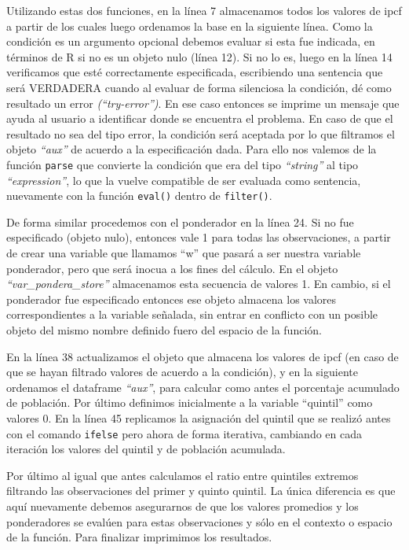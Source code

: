 \documentclass[
]{book}
\begin{document}
Utilizando estas dos funciones, en la línea 7 almacenamos todos los valores de ipcf a partir de los cuales luego ordenamos la base en la siguiente línea. Como la condición es un argumento opcional debemos evaluar si esta fue indicada, en términos de R si no es un objeto nulo (línea 12). Si no lo es, luego en la línea 14 verificamos que esté correctamente especificada, escribiendo una sentencia que será VERDADERA cuando al evaluar de forma silenciosa la condición, dé como resultado un error \emph{(``try-error'')}. En ese caso entonces se imprime un mensaje que ayuda al usuario a identificar donde se encuentra el problema. En caso de que el resultado no sea del tipo error, la condición será aceptada por lo que filtramos el objeto \emph{``aux''} de acuerdo a la especificación dada. Para ello nos valemos de la función \texttt{parse} que convierte la condición que era del tipo \emph{``string''} al tipo \emph{``expression''}, lo que la vuelve compatible de ser evaluada como sentencia, nuevamente con la función \texttt{eval()} dentro de \texttt{filter()}.

De forma similar procedemos con el ponderador en la línea 24. Si no fue especificado (objeto nulo), entonces vale 1 para todas las observaciones, a partir de crear una variable que llamamos ``w'' que pasará a ser nuestra variable ponderador, pero que será inocua a los fines del cálculo. En el objeto \emph{``var\_pondera\_store''} almacenamos esta secuencia de valores 1. En cambio, si el ponderador fue especificado entonces ese objeto almacena los valores correspondientes a la variable señalada, sin entrar en conflicto con un posible objeto del mismo nombre definido fuero del espacio de la función.

En la línea 38 actualizamos el objeto que almacena los valores de ipcf (en caso de que se hayan filtrado valores de acuerdo a la condición), y en la siguiente ordenamos el dataframe \emph{``aux''}, para calcular como antes el porcentaje acumulado de población. Por último definimos inicialmente a la variable ``quintil'' como valores 0. En la línea 45 replicamos la asignación del quintil que se realizó antes con el comando \texttt{ifelse} pero ahora de forma iterativa, cambiando en cada iteración los valores del quintil y de población acumulada.

Por último al igual que antes calculamos el ratio entre quintiles extremos filtrando las observaciones del primer y quinto quintil. La única diferencia es que aquí nuevamente debemos asegurarnos de que los valores promedios y los ponderadores se evalúen para estas observaciones y sólo en el contexto o espacio de la función. Para finalizar imprimimos los resultados.
\end{document}
